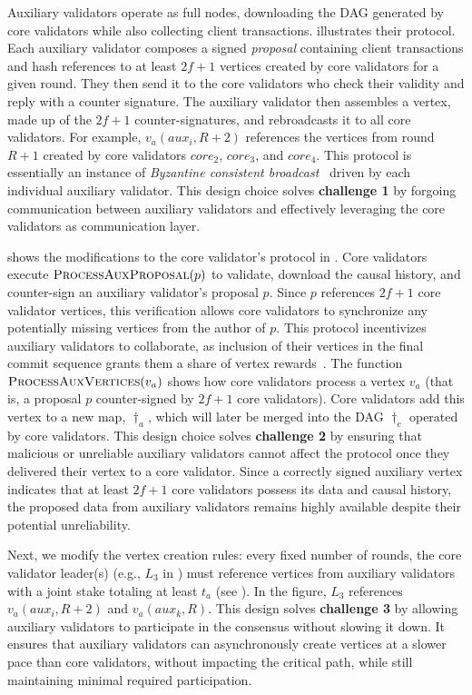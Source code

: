 Auxiliary validators operate as full nodes, downloading the DAG generated by core validators while also collecting client transactions.  illustrates their protocol. Each auxiliary validator composes a signed \emph{proposal} containing client transactions and hash references to at least $2f + 1$ vertices created by core validators for a given round. They then send it to the core validators who check their validity and reply with a counter signature. The auxiliary validator then assembles a vertex, made up of the $2f + 1$ counter-signatures, and rebroadcasts it to all core validators. For example, $v_a(aux_i, R+2)$ references the vertices from round $R+1$ created by core validators $core_2$, $core_3$, and $core_4$. This protocol is essentially an instance of \emph{Byzantine consistent broadcast}~\cite{cachin2011introduction} driven by each individual auxiliary validator.
%
This design choice solves \textbf{challenge 1} by forgoing communication between auxiliary validators and effectively leveraging the core validators as communication layer.

 shows the modifications to the core validator's protocol in . Core validators execute $\Call{ProcessAuxProposal}{p}$ to validate, download the causal history, and counter-sign an auxiliary validator's proposal $p$. Since $p$ references $2f + 1$ core validator vertices, this verification allows core validators to synchronize any potentially missing vertices from the author of $p$. This protocol incentivizes auxiliary validators to collaborate, as inclusion of their vertices in the final commit sequence grants them a share of vertex rewards~\cite{ethereum}. The function $\Call{ProcessAuxVertices}{v_a}$ shows how core validators process a vertex $v_a$ (that is, a proposal $p$ counter-signed by $2f + 1$ core validators). Core validators add this vertex to a new map, $\dag_a$, which will later be merged into the DAG $\dag_c$ operated by core validators.
%
This design choice solves \textbf{challenge 2} by ensuring that malicious or unreliable auxiliary validators cannot affect the protocol once they delivered their vertex to a core validator. Since a correctly signed auxiliary vertex indicates that at least $2f + 1$ core validators possess its data and causal history, the proposed data from auxiliary validators remains highly available despite their potential unreliability.

Next, we modify the vertex creation rules: every fixed number of rounds, the core validator leader(s) (e.g., $L_3$ in ) must reference vertices from auxiliary validators with a joint stake totaling at least $t_a$ (see ). In the figure, $L_3$ references $v_a(aux_i, R+2)$ and $v_a(aux_k, R)$.
%
This design solves \textbf{challenge 3} by allowing auxiliary validators to participate in the consensus without slowing it down. It ensures that auxiliary validators can asynchronously create vertices at a slower pace than core validators, without impacting the critical path, while still maintaining minimal required participation.


